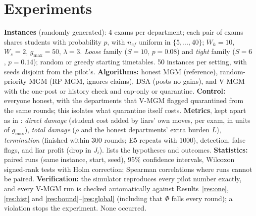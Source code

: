 \documentclass{article}
\theoremstyle{definition}
\newcommand{\1}{\mathbf{1}}
\newcommand{\gmax}{g_{\max}}
\begin{document}
\section{Experiments}
\label{sec:exp}
\textbf{Instances} (randomly generated): 4 exams per department; each pair of exams shares students with probability $p$, with $n_{ef}$ uniform in $\{5,\dots,40\}$; $W_h=10$, $W_s=2$, $\gmax=50$, $\lambda=3$. \emph{Loose} family ($S=10$, $p=0.08$) and \emph{tight} family ($S=6$, $p=0.14$); random or greedy starting timetables. 50 instances per setting, with seeds disjoint from the pilot's. \textbf{Algorithms:} honest MGM (reference), random-priority MGM (RP-MGM, ignores claims), DSA (posts no gains), and V-MGM with the one-post or history check and cap-only or quarantine. \textbf{Control:} everyone honest, with the departments that V-MGM flagged quarantined from the same rounds; this isolates what quarantine itself costs. \textbf{Metrics}, kept apart as in : \emph{direct damage} (student cost added by liars' own moves, per exam, in units of $\gmax$), \emph{total damage} ($\rho$ and the honest departments' extra burden $L$), \emph{termination} (finished within 300 rounds; E5 repeats with 1000), detection, false flags, and liar profit (drop in $J_i$).  lists the hypotheses and outcomes. \textbf{Statistics:} paired runs (same instance, start, seed), 95\% confidence intervals, Wilcoxon signed-rank tests with Holm correction; Spearman correlations where runs cannot be paired.
\textbf{Verification:} the simulator reproduces every pilot number exactly, and every V-MGM run is checked automatically against Results~\ref{res:one}, \ref{res:hist} and \ref{res:bound}--\ref{res:global} (including that $\Phi$ falls every round); a violation stops the experiment. None occurred.
\end{document}
